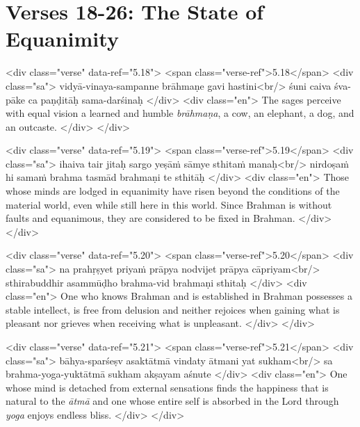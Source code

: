 \section{Verses 18-26: The State of Equanimity}\label{sec-verses-18-26-the-state-of-equanimity}


\begin{html}
<div class="verse" data-ref="5.18">
  <span class="verse-ref">5.18</span>
  <div class="sa">
    vidyā-vinaya-sampanne brāhmaṇe gavi hastini<br/>
    śuni caiva śva-pāke ca paṇḍitāḥ sama-darśinaḥ
  </div>
  <div class="en">
    The sages perceive with equal vision a learned and humble \textit{brāhmaṇa}, a cow, an elephant, a dog, and an outcaste.
  </div>
</div>
\end{html}



\begin{html}
<div class="verse" data-ref="5.19">
  <span class="verse-ref">5.19</span>
  <div class="sa">
    ihaiva tair jitaḥ sargo yeṣāṁ sāmye sthitaṁ manaḥ<br/>
    nirdoṣaṁ hi samaṁ brahma tasmād brahmaṇi te sthitāḥ
  </div>
  <div class="en">
    Those whose minds are lodged in equanimity have risen beyond the conditions of the material world, even while still here in this world. Since Brahman is without faults and equanimous, they are considered to be fixed in Brahman.
  </div>
</div>
\end{html}



\begin{html}
<div class="verse" data-ref="5.20">
  <span class="verse-ref">5.20</span>
  <div class="sa">
    na prahṛṣyet priyaṁ prāpya nodvijet prāpya cāpriyam<br/>
    sthirabuddhir asammūḍho brahma-vid brahmaṇi sthitaḥ
  </div>
  <div class="en">
    One who knows Brahman and is established in Brahman possesses a stable intellect, is free from delusion and neither rejoices when gaining what is pleasant nor grieves when receiving what is unpleasant.
  </div>
</div>
\end{html}



\begin{html}
<div class="verse" data-ref="5.21">
  <span class="verse-ref">5.21</span>
  <div class="sa">
    bāhya-sparśeṣv asaktātmā vindaty ātmani yat sukham<br/>
    sa brahma-yoga-yuktātmā sukham akṣayam aśnute
  </div>
  <div class="en">
    One whose mind is detached from external sensations finds the happiness that is natural to the \textit{ātmā} and one whose entire self is absorbed in the Lord through \textit{yoga} enjoys endless bliss.
  </div>
</div>
\end{html}



